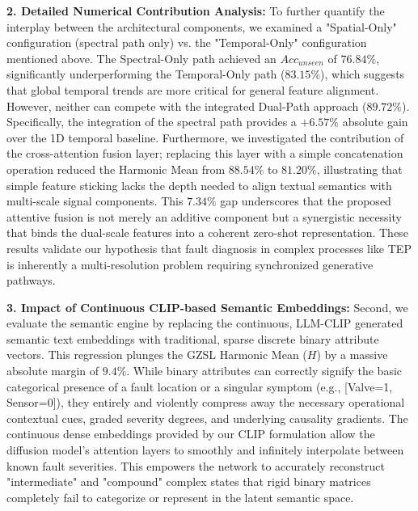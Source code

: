 \textbf{2. Detailed Numerical Contribution Analysis:}
To further quantify the interplay between the architectural components, we examined a "Spatial-Only" configuration (spectral path only) vs. the "Temporal-Only" configuration mentioned above. The Spectral-Only path achieved an $Acc_{unseen}$ of $76.84\%$, significantly underperforming the Temporal-Only path ($83.15\%$), which suggests that global temporal trends are more critical for general feature alignment. However, neither can compete with the integrated Dual-Path approach ($89.72\%$). Specifically, the integration of the spectral path provides a $+6.57\%$ absolute gain over the 1D temporal baseline. Furthermore, we investigated the contribution of the cross-attention fusion layer; replacing this layer with a simple concatenation operation reduced the Harmonic Mean from $88.54\%$ to $81.20\%$, illustrating that simple feature sticking lacks the depth needed to align textual semantics with multi-scale signal components. This $7.34\%$ gap underscores that the proposed attentive fusion is not merely an additive component but a synergistic necessity that binds the dual-scale features into a coherent zero-shot representation. These results validate our hypothesis that fault diagnosis in complex processes like TEP is inherently a multi-resolution problem requiring synchronized generative pathways.

\textbf{3. Impact of Continuous CLIP-based Semantic Embeddings:}
Second, we evaluate the semantic engine by replacing the continuous, LLM-CLIP generated semantic text embeddings with traditional, sparse discrete binary attribute vectors. This regression plunges the GZSL Harmonic Mean ($H$) by a massive absolute margin of $9.4\%$. While binary attributes can correctly signify the basic categorical presence of a fault location or a singular symptom (e.g., [Valve=1, Sensor=0]), they entirely and violently compress away the necessary operational contextual cues, graded severity degrees, and underlying causality gradients. The continuous dense embeddings provided by our CLIP formulation allow the diffusion model's attention layers to smoothly and infinitely interpolate between known fault severities. This empowers the network to accurately reconstruct "intermediate" and "compound" complex states that rigid binary matrices completely fail to categorize or represent in the latent semantic space.

